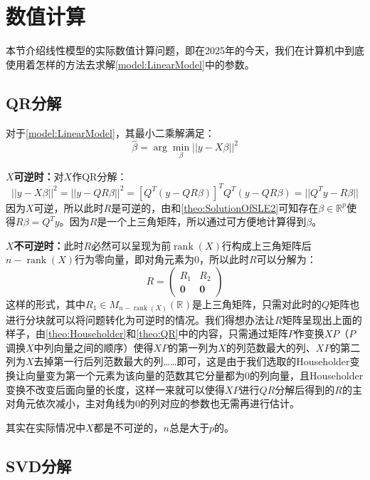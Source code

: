 \section{数值计算}

本节介绍线性模型的实际数值计算问题，即在2025年的今天，我们在计算机中到底使用着怎样的方法去求解\cref{model:LinearModel}中的参数。

\subsection{QR分解}
对于\cref{model:LinearModel}，其最小二乘解满足：
\begin{equation*}
	\hat{\beta}=\arg\min_{\beta}||y-X\beta||^2
\end{equation*}\par
\textbf{$X$可逆时：}对$X$作QR分解：
\begin{equation*}
	||y-X\beta||^2=||y-QR\beta||^2=[Q^T(y-QR\beta)]^TQ^T(y-QR\beta)=||Q^Ty-R\beta||
\end{equation*}
因为$X$可逆，所以此时$R$是可逆的，由和\cref{theo:SolutionOfSLE2}可知存在$\beta\in\mathbb{R}^{p}$使得$R\beta=Q^Ty$。因为$R$是一个上三角矩阵，所以通过可方便地计算得到$\beta$。\par
\textbf{$X$不可逆时：}此时$R$必然可以呈现为前$\operatorname{rank}(X)$行构成上三角矩阵后$n-\operatorname{rank}(X)$行为零向量，即对角元素为$0$，所以此时$R$可以分解为：
\begin{equation*}
	R=
	\begin{pmatrix}
		R_1 & R_2 \\
		\mathbf{0} & \mathbf{0}
	\end{pmatrix}
\end{equation*}
这样的形式，其中$R_1\in M_{n-\operatorname{rank}(X)}(\mathbb{R}^{})$是上三角矩阵，只需对此时的$Q$矩阵也进行分块就可以将问题转化为可逆时的情况。我们得想办法让$R$矩阵呈现出上面的样子，由\cref{theo:Householder}和\cref{theo:QR}中的内容，只需通过矩阵$P$作变换$XP$（$P$调换$X$中列向量之间的顺序）使得$XP$的第一列为$X$的列范数最大的列、$XP$的第二列为$X$去掉第一行后列范数最大的列……即可，这是由于我们选取的Householder变换让向量变为第一个元素为该向量的范数其它分量都为$0$的列向量，且Householder变换不改变后面向量的长度，这样一来就可以使得$XP$进行$QR$分解后得到的$R$的主对角元依次减小，主对角线为$0$的列对应的参数也无需再进行估计。\par
\begin{note}
	其实在实际情况中$X$都是不可逆的，$n$总是大于$p$的。
\end{note}

\subsection{SVD分解}